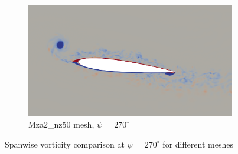 \begin{figure}[H]
	\begin{subfigure}[b]{0.6\textwidth}
		\centering
		\includegraphics[width=1\textwidth]{figures/zonal_adapt_results/vorticity_plots_Re200k/Mza2_50/phase_270.png}
		\caption{Mza2\_nz50 mesh, $\psi$ = $270^\circ$}
		\label{fig:Mza2_50_Re200k_sp_psi270}
	\end{subfigure}	
	\caption{Spanwise vorticity comparison at $\psi$ = $270^\circ$ for different meshes}
	\label{fig:vorticity_Re200k_sp_270}
\end{figure}


